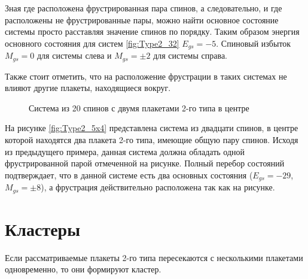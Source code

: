 \documentclass[utf8, babel, sor, jor, amsmath, amssymb, reprint]{elsarticle} %
\begin{document}
Зная где расположена фрустрированная пара спинов, а следовательно, и где расположены не фрустрированные пары, можно найти основное состояние системы просто расставляя значение спинов по порядку. Таким образом энергия основного состояния для систем \ref{fig:Type2_32} $E_{gs}=-5$. Спиновый избыток $M_{gs}=0$ для системы слева и $M_{gs}=\pm 2$ для системы справа.

Также стоит отметить, что на расположение фрустрации в таких системах  не влияют другие плакеты, находящиеся вокруг.

\begin{figure}[H]
	\centering
	\caption{Система из 20 спинов с двумя плакетами 2-го типа в центре}
	\label{fig:Type2_5x4}
\end{figure}

На рисунке \eqref{fig:Type2_5x4} представлена система из двадцати спинов, в центре которой находятся два плакета 2-го типа, имеющие общую пару спинов. Исходя из предыдущего примера, данная система должна обладать одной фрустрированной парой отмеченной на рисунке. Полный перебор состояний подтверждает, что в данной системе есть два основных состояния ($E_{gs}=-29$, $M_{gs}=\pm 8$), а фрустрация действительно расположена так как на рисунке.

\section{Кластеры}

Если рассматриваемые плакеты 2-го типа пересекаются с несколькими плакетами одновременно, то они формируют кластер.
\end{document}

